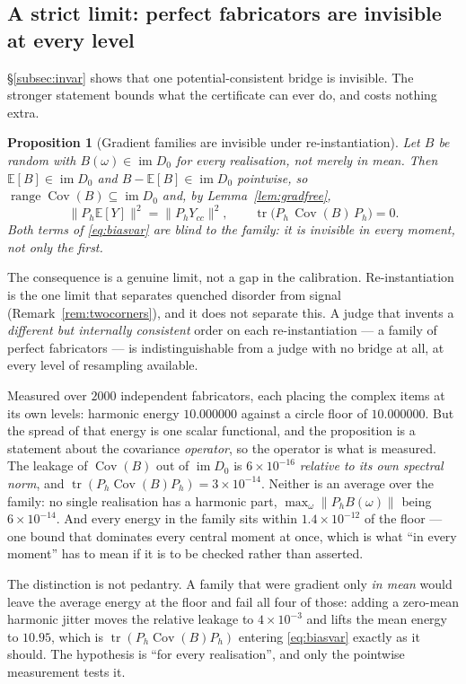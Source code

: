\documentclass[11pt,a4paper]{article}
\newtheorem{proposition}{Proposition}
\theoremstyle{definition}
\theoremstyle{remark}
\newcommand{\im}{\operatorname{im}}
\newcommand{\Cov}{\operatorname{Cov}}
\newcommand{\tr}{\operatorname{tr}}
\newcommand{\Ph}{P_h}
\begin{document}
\subsection{A strict limit: perfect fabricators are invisible at every level}

\S\ref{subsec:invar} shows that one potential-consistent bridge is invisible. The
stronger statement bounds what the certificate can ever do, and costs nothing extra.

\begin{proposition}[Gradient families are invisible under re-instantiation]\label{prop:fabricators}
Let $B$ be random with $B(\omega)\in\im D_0$ for \emph{every} realisation, not
merely in mean. Then $\mathbb{E}[B]\in\im D_0$ and $B-\mathbb{E}[B]\in\im D_0$
pointwise, so $\operatorname{range}\Cov(B)\subseteq\im D_0$ and, by Lemma~\ref{lem:gradfree},
\[
\|\Ph\mathbb{E}[Y]\|^2=\|\Ph Y_{cc}\|^2,
\qquad
\tr\!\bigl(\Ph\,\Cov(B)\,\Ph\bigr)=0 .
\]
Both terms of \eqref{eq:biasvar} are blind to the family: it is invisible in every
moment, not only the first.
\end{proposition}

The consequence is a genuine limit, not a gap in the calibration. Re-instantiation
is the one limit that separates quenched disorder from signal (Remark~\ref{rem:twocorners}), and it
does not separate this. A judge that invents a \emph{different but internally
consistent} order on each re-instantiation --- a family of perfect fabricators ---
is indistinguishable from a judge with no bridge at all, at every level of
resampling available.

Measured over $2000$ independent fabricators, each placing the complex items at
its own levels: harmonic energy $10.000000$ against a circle floor of
$10.000000$. But the spread of that energy is one scalar functional, and the
proposition is a statement about the covariance \emph{operator}, so the operator
is what is measured. The leakage of $\Cov(B)$ out of $\im D_0$ is
$6\times10^{-16}$ \emph{relative to its own spectral norm}, and
$\tr(\Ph\Cov(B)\Ph)=3\times10^{-14}$. Neither is an average over the family:
no single realisation has a harmonic part, $\max_\omega\|\Ph B(\omega)\|$ being
$6\times10^{-14}$. And every energy in the family sits within $1.4\times10^{-12}$
of the floor --- one bound that dominates every central moment at once, which is
what ``in every moment'' has to mean if it is to be checked rather than asserted.

The distinction is not pedantry. A family that were gradient only \emph{in mean}
would leave the average energy at the floor and fail all four of those: adding a
zero-mean harmonic jitter moves the relative leakage to $4\times10^{-3}$ and
lifts the mean energy to $10.95$, which is $\tr(\Ph\Cov(B)\Ph)$ entering
\eqref{eq:biasvar} exactly as it should. The hypothesis is ``for every
realisation'', and only the pointwise measurement tests it.
\end{document}
